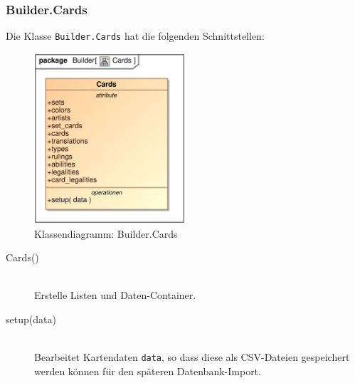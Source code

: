 \subsubsection{Builder.Cards}
Die Klasse \verb|Builder.Cards| hat die folgenden Schnittstellen:
\begin{figure}[H]
    \myfloatalign
    \includegraphics[width=0.5\textwidth]{gfx/MtGDeepAnalysis/Cards.eps}
    \caption{Klassendiagramm: Builder.Cards}
    \label{fig:class:builder.cards}
\end{figure}
\begin{description}
    \item[Cards()] \hfill \\
    Erstelle Listen und Daten-Container.
    
    \item[setup(data)] \hfill \\
    Bearbeitet Kartendaten \verb|data|, so dass diese als \ac{CSV}-Dateien gespeichert werden können für den späteren Datenbank-Import.
\end{description}


